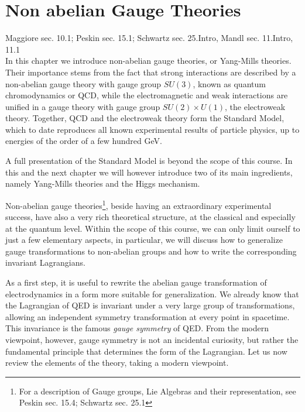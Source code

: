 \documentclass[TheoreticalPhy_ModB.tex]{subfiles}
\begin{document}
\chapter{Non abelian Gauge Theories}
\textsf{Maggiore sec. 10.1; Peskin sec. 15.1; Schwartz sec. 25.Intro, Mandl sec. 11.Intro, 11.1}\\

In this chapter we introduce non-abelian gauge theories, or Yang-Mills theories. Their importance stems from the fact that strong interactions are described by a non-abelian gauge theory with gauge group $SU(3)$, known as quantum chromodynamics or QCD, while the electromagnetic and weak interactions are unified in a gauge theory with gauge group $SU(2)\times U(1)$, the electroweak theory. Together, QCD and the electroweak theory form the Standard Model, which to date reproduces all known experimental results of particle physics, up to energies of the order of a few hundred GeV.

A full presentation of the Standard Model is beyond the scope of this course. In this and the next chapter we will however introduce two of its main ingredients, namely Yang-Mills theories and the Higgs mechanism. 

Non-abelian gauge theories\footnote{For a description of Gauge groups, Lie Algebras and their representation, see \textsf{Peskin sec. 15.4; Schwartz sec. 25.1}}, beside having an extraordinary experimental success, have also a very rich theoretical structure, at the classical and especially at the quantum level. Within the scope of this course, we can only limit ourself to just a few elementary aspects, in particular, we will discuss how to generalize gauge transformations to non-abelian groups and how to write the corresponding invariant Lagrangians. 

As a first step, it is useful to rewrite the abelian gauge transformation of electrodynamics in a form more suitable for generalization. 
We already know that the Lagrangian of QED is invariant under a very large group of transformations, allowing an independent symmetry transformation at every point in spacetime. This invariance is the famous \emph{gauge symmetry} of QED. From the modern viewpoint, however, gauge symmetry is not an incidental curiosity, but rather the fundamental principle that determines the form of the Lagrangian. Let us now review the elements of the theory, taking a modern viewpoint. 
\end{document}
